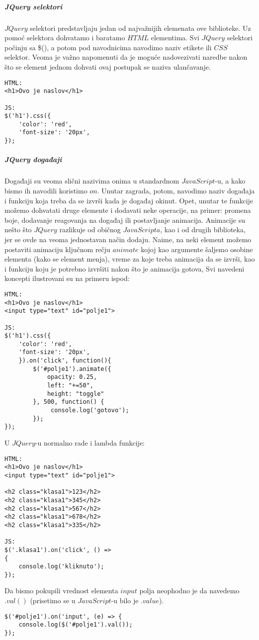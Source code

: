 \subparagraph{JQuery selektori}
$JQuery$ selektori predstavljaju jedan od najvažnijih elemenata ove biblioteke. Uz pomoć selektora dohvatamo i baratamo $HTML$ elementima. Svi $JQuery$ selektori počinju sa \$(), a potom pod navodnicima navodimo naziv etikete ili $CSS$ selektor. Veoma je važno napomenuti da je moguće nadovezivati naredbe nakon što se element jednom dohvati ovaj postupak se naziva ulančavanje.
\begin{lstlisting}[backgroundcolor = \color{lightgray}, breaklines=true]
HTML:
<h1>Ovo je naslov</h1>

JS:
$('h1').css({
    'color': 'red',
    'font-size': '20px',
});
\end{lstlisting}
\subparagraph{JQuery događaji}
Događaji su veoma slični nazivima onima u standardnom $JavaScript$-u, a kako bismo ih navodili koristimo $on$. Unutar zagrada, potom, navodimo naziv događaja i funkciju koja treba da se izvrši kada je događaj okinut. Opet, unutar te funkcije možemo dohvatati druge elemente i dodavati neke operacije, na primer: promena boje, dodavanje reagovanja na događaj ili postavljanje animacija. Animacije su nešto što $JQuery$ razlikuje od običnog $JavaScripta$, kao i od drugih biblioteka, jer se ovde na veoma jednostavan način dodaju. Naime, na neki element možemo postaviti animaciju ključnom rečju $animate$ kojoj kao argumente šaljemo osobine elementa (kako se element menja), vreme za koje treba animacija da se izvrši, kao i funkciju koju je potrebno izvršiti nakon što je animacija gotova, Svi navedeni koncepti ilustrovani su na primeru ispod:
\begin{lstlisting}[backgroundcolor = \color{lightgray}, breaklines=true]
HTML:
<h1>Ovo je naslov</h1>
<input type="text" id="polje1">

JS:
$('h1').css({
    'color': 'red',
    'font-size': '20px',
    }).on('click', function(){
        $('#polje1').animate({
            opacity: 0.25,
            left: "+=50",
            height: "toggle"
        }, 500, function() {
             console.log('gotovo');
        });
});
\end{lstlisting}
U $JQuery$-u normalno rade i lambda funkcije:
\begin{lstlisting}[backgroundcolor = \color{lightgray}, breaklines=true]
HTML:
<h1>Ovo je naslov</h1>
<input type="text" id="polje1">

<h2 class="klasa1">123</h2>
<h2 class="klasa1">345</h2>
<h2 class="klasa1">567</h2>
<h2 class="klasa1">678</h2>
<h2 class="klasa1">335</h2>

JS:
$('.klasa1').on('click', () =>
{
    console.log('kliknuto');
});
\end{lstlisting}
Da bismo pokupili vrednost elementa $input$ polja neophodno je da navedemo $.val()$ (prisetimo se u $JavaScript$-u bilo je $.value$). 
\begin{lstlisting}[backgroundcolor = \color{lightgray}, breaklines=true]
$('#polje1').on('input', (e) => {
    console.log($('#polje1').val());
});
\end{lstlisting}